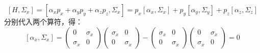 \begin{equation}
\left[H, \Sigma_{x}\right]=\left[\alpha_{x} p_{x}+\alpha_{y} p_{y}+\alpha_{z} p_{z}, \Sigma_{x}\right]=p_{x}\left[\alpha_{x}, \Sigma_{x}\right]+p_{y}\left[\alpha_{y}, \Sigma_{y}\right]+p_{z}\left[\alpha_{z}, \Sigma_{z}\right]
\end{equation}
分别代入两个算符，得：
\begin{equation}\label{qed4_eq26}
\left[\alpha_{x}, \Sigma_{x}\right] = \left(\begin{array}{cc}
0 & \sigma_{x} \\
\sigma_{x} & 0
\end{array}\right)\left(\begin{array}{cc}
\sigma_{x} & 0 \\
0 & \sigma_{x}
\end{array}\right)-\left(\begin{array}{cc}
\sigma_{x} & 0 \\
0 & \sigma_{x}
\end{array}\right)\left(\begin{array}{cc}
0 & \sigma_{x} \\
\sigma_{x} & 0
\end{array}\right) = 0
\end{equation}

